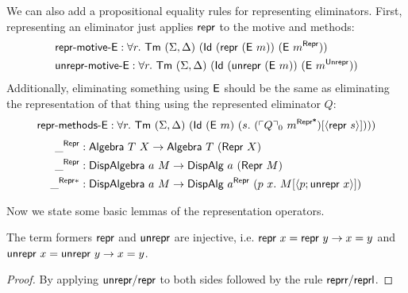 We can also add a propositional equality rules for representing eliminators.
First, representing an eliminator just applies $\textsf{repr}$ to the motive and methods:
\begin{align*}
&\mta{repr-motive-E} : \forall r.\ \Tm\ (\Sigma, \Delta)\ (\mta{Id}\ (\Mrepr\ (\mta{E}\ m))\ (\mta{E}\ m^\mta{Repr})) \\
&\mta{unrepr-motive-E} : \forall r.\ \Tm\ (\Sigma, \Delta)\ (\mta{Id}\ (\Munrepr\ (\mta{E}\ m))\ (\mta{E}\ m^\mta{Unrepr}))
\end{align*}
Additionally, eliminating something using $\textsf{E}$ should be the same as
eliminating the representation of that thing using the represented eliminator $Q$:
\begin{align*}
&\mta{repr-methods-E} : \forall r.\ \Tm\ (\Sigma, \Delta)\ (\mta{Id}\ (\mta{E}\ m)\ (s.\ (\emb{Q}_0\ m^{\mta{Repr*}})[\Msub{\mta{repr}\ s}]))) \\
\end{align*}
\begin{align*}
\_^{\mta{Repr}} &: \mta{Algebra}\ T\ X \to \mta{Algebra}\ T\ (\mta{Repr}\ X) \\
 \_^{\mta{Repr}} &: \mta{DispAlgebra}\ a\ M \to \mta{DispAlg}\ a\ (\MRepr\ M) \\
 \_^{\mta{Repr}*} &: \mta{DispAlgebra}\ a\ M \to \mta{DispAlg}\ a^{\mta{Repr}}\ (p\ x .\ M[\Msub{p;\mta{unrepr}\ x}])
\end{align*}

Now we state some basic lemmas of the representation operators.

\begin{lemma}
	The term formers $\textsf{repr}{}$ and $\textsf{unrepr}{}$ are injective, i.e.
	$\textsf{repr}\ x = \textsf{repr}\ y \to x = y$ and $\textsf{unrepr}\ x = \textsf{unrepr}\ y \to x = y$.
	\begin{proof}
				By applying $\textsf{unrepr}/\textsf{repr}$ to both sides
				followed by the rule $\textsf{reprr}/\textsf{reprl}$.
	\end{proof}
\end{lemma}

